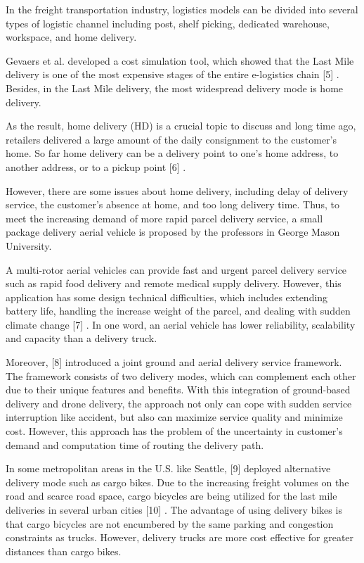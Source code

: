 \documentclass[12pt]{ksthesis}
\begin{document}
\begin{thesis}
{In the freight transportation industry, logistics models can be divided into several types of logistic channel including post, shelf picking, dedicated warehouse, workspace, and home delivery.

Gevaers et al. developed a cost simulation tool, which showed that the Last Mile delivery is one of the most expensive stages of the entire e-logistics chain [5] \cite{Gevaers2014}. Besides, in the Last Mile delivery, the most widespread delivery mode is home delivery.

As the result, home delivery (HD) is a crucial topic to discuss and long time ago, retailers delivered a large amount of the daily consignment to the customer’s home. So far home delivery can be a delivery point to one’s home address, to another address, or to a pickup point [6] \cite{Zhou2016}. 

However, there are some issues about home delivery, including delay of delivery service, the customer’s absence at home, and too long delivery time. Thus, to meet the increasing demand of more rapid parcel delivery service, a small package delivery aerial vehicle is proposed by the professors in George Mason University.

A multi-rotor aerial vehicles can provide fast and urgent parcel delivery service such as rapid food delivery and remote medical supply delivery. However, this application has some design technical difficulties, which includes extending battery life, handling the increase weight of the parcel, and dealing with sudden climate change [7] \cite{Ali2015}. In one word, an aerial vehicle has lower reliability, scalability and capacity than a delivery truck.

Moreover, [8] \cite{Sawadsitang2018} introduced a joint ground and aerial delivery service framework. The framework consists of two delivery modes, which can complement each other due to their unique features and benefits. With this integration of ground-based delivery and drone delivery, the approach not only can cope with sudden service interruption like accident, but also can maximize service quality and minimize cost. However, this approach has the problem of the uncertainty in customer’s demand and computation time of routing the delivery path. 

In some metropolitan areas in the U.S. like Seattle, [9] \cite{Sheth2019} deployed alternative delivery mode such as cargo bikes. Due to the increasing freight volumes on the road and scarce road space, cargo bicycles are being utilized for the last mile deliveries in several urban cities [10] \cite{Melo2017}. The advantage of using delivery bikes is that cargo bicycles are not encumbered by the same parking and congestion constraints as trucks. However, delivery trucks are more cost effective for greater distances than cargo bikes.

}
\end{thesis}
\end{document}
